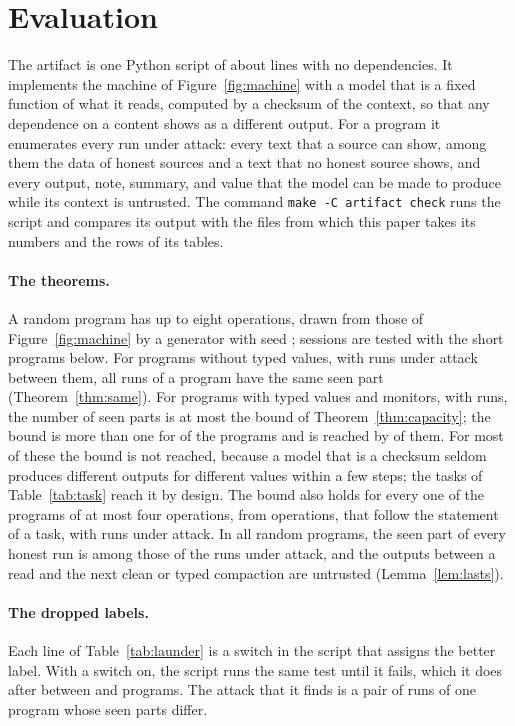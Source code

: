 \documentclass[acmsmall,nonacm,screen]{acmart}
\newcommand{\claim}[2]{#2}
\begin{document}
\section{Evaluation}
\label{sec:eval}

The artifact is one Python script of about \exLines{} lines with no dependencies. It
implements the machine of Figure~\ref{fig:machine} with a model that is a fixed function of
what it reads, computed by a checksum of the context, so that any dependence on a content
shows as a different output. For a program it enumerates every run under attack: every text
that a source can show, among them the data of honest sources and a text that no honest
source shows, and every output, note, summary, and value that the model can be made to
produce while its context is untrusted. The command \texttt{make -C artifact check} runs the
script and compares its output with the files from which this paper takes its numbers and
the rows of its tables.

\paragraph{The theorems.} A random program has up to eight operations, drawn from those of
Figure~\ref{fig:machine} by a generator with seed \exSeed{}; sessions are tested with the
short programs below. \claim{same}{For \exPrograms{}
programs without typed values, with \exPlainRuns{} runs under attack between them, all runs
of a program have the same seen part (Theorem~\ref{thm:same}).} \claim{capacity}{For
\exPrograms{} programs with typed values and monitors, with \exTypedRuns{} runs, the number
of seen parts is at most the bound of Theorem~\ref{thm:capacity}; the bound is more than one
for \exTypedMore{} of the programs and is reached by \exTypedFull{} of them.} For most of these the bound is not reached, because a
model that is a checksum seldom produces different outputs for different values within a few
steps; the tasks of Table~\ref{tab:task} reach it by design. \claim{short}{The bound also holds for every one of the \exShortPrograms{} programs of at most
four operations, from \exShortOps{} operations, that follow the statement of a task, with
\exShortRuns{} runs under attack.} In all random programs, the seen part
of every honest run is among those of the runs under attack, and the outputs between a read
and the next clean or typed compaction are untrusted (Lemma~\ref{lem:lasts}).

\paragraph{The dropped labels.} Each line of Table~\ref{tab:launder} is a switch in the
script that assigns the better label. With a switch on, the script runs the same test until
it fails, which it does after between \exTryLeast{} and \exTryMost{} programs. The attack
that it finds is a pair of runs of one program whose seen parts differ.
\end{document}
